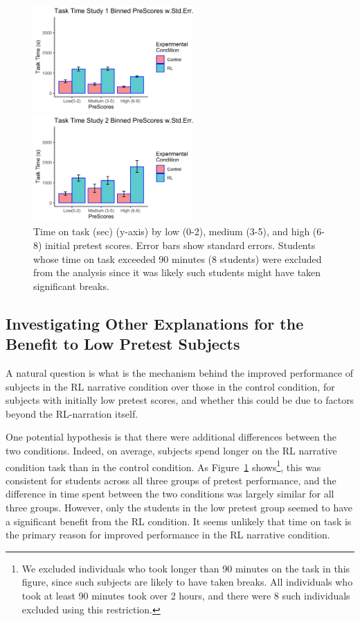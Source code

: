 \documentclass[sn-mathphys,Numbered]{sn-jnl}%
\theoremstyle{thmstyleone}%
\theoremstyle{thmstyletwo}%
\theoremstyle{thmstylethree}%
\begin{document}
\begin{figure}[tb]
\centering
 \begin{minipage}{0.45\columnwidth}
  \centering
    \includegraphics[height=1.6in]{Figures/study1bar_pre_tasktime_stde_bin_rm_over_90.png}
 \end{minipage} \hfill
  \begin{minipage}{0.45\columnwidth}
\centering
    \includegraphics[height=1.6in]{Figures/study2bar_pre_tasktime_stde_bin_rm_over_90.png}
 \end{minipage}
 \caption{Time on task (sec) (y-axis) by low (0-2), medium (3-5), and high (6-8) initial pretest scores. Error bars show standard errors. Students whose time on task exceeded 90 minutes (8 students) were excluded from the analysis since it was likely such students might have taken significant breaks.}
      \label{rlbot:fig:time_on_task}
 \end{figure}

\subsection{Investigating Other Explanations for the Benefit to Low Pretest Subjects}
A natural question is what is the mechanism behind the improved performance of subjects in the 
RL narrative condition over those in the control condition, for subjects with initially low pretest scores, and whether this could be due to factors beyond the RL-narration itself.

One potential hypothesis is that there were additional differences between the two conditions. Indeed, on average, subjects spend longer on the RL narrative condition task than in the control condition. As Figure~\ref{rlbot:fig:time_on_task} shows\footnote{We excluded individuals who took longer than 90 minutes on the task in this figure, since such subjects are likely to have taken breaks. All individuals who took at least 90 minutes took over 2 hours, and there were 8 such individuals excluded using this restriction.}, this was consistent for students across all three groups of pretest performance, and the difference in time spent between the two conditions was largely similar for all three groups. However, only the students in the low pretest group seemed to have a significant benefit from the RL condition. It seems unlikely that time on task is the primary reason for improved performance in the RL narrative condition. 
\end{document}
